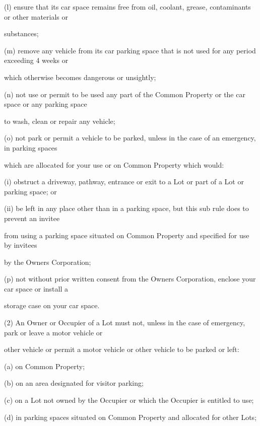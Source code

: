 \documentclass{article}
\begin{document}
{\fontsize{9.962}{1}(l) ensure that its car space remains free from oil, coolant, grease, contaminants or other materials or }

{\fontsize{10.02}{1}substances; }

{\fontsize{9.962}{1}(m) remove any vehicle from its car parking space that is not used for any period exceeding 4 weeks or }

{\fontsize{10.02}{1}which otherwise becomes dangerous or unsightly; }

{\fontsize{9.962}{1}(n) not use or permit to be used any part of the Common Property or the car space or any parking space }

{\fontsize{10.02}{1}to wash, clean or repair any vehicle; }

{\fontsize{9.962}{1}(o) not park or permit a vehicle to be parked, unless in the case of an emergency, in parking spaces }

{\fontsize{10.02}{1}which are allocated for your use or on Common Property which would: }

{\fontsize{9.962}{1}(i) obstruct a driveway, pathway, entrance or exit to a Lot or part of a Lot or parking space; or }

{\fontsize{9.962}{1}(ii) be left in any place other than in a parking space, but this sub rule does to prevent an invitee }

{\fontsize{10.02}{1}from using a parking space situated on Common Property and specified for use by invitees }

{\fontsize{10.02}{1}by the Owners Corporation; }

{\fontsize{9.962}{1}(p) not without prior written consent from the Owners Corporation, enclose your car space or install a }

{\fontsize{10.02}{1}storage case on your car space. }

{\fontsize{9.962}{1}(2) An Owner or Occupier of a Lot must not, unless in the case of emergency, park or leave a motor vehicle or }

{\fontsize{10.02}{1}other vehicle or permit a motor vehicle or other vehicle to be parked or left: }

{\fontsize{9.962}{1}(a) on Common Property; }

{\fontsize{9.962}{1}(b) on an area designated for visitor parking; }

{\fontsize{9.962}{1}(c) on a Lot not owned by the Occupier or which the Occupier is entitled to use; }

{\fontsize{9.962}{1}(d) in parking spaces situated on Common Property and allocated for other Lots; }
\end{document}
